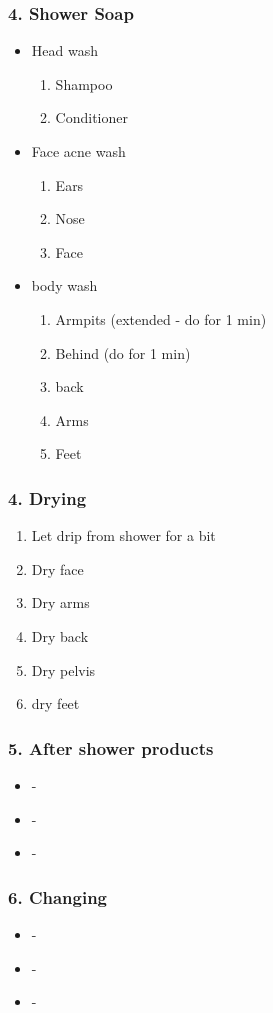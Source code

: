 \begin{frame}
\frametitle{4. Shower Soap  }
\begin{itemize}
\item Head wash
\begin{enumerate}
\item \tiny Shampoo
\item \tiny Conditioner
\end{enumerate}
\item Face acne wash
\begin{enumerate}
\item \tiny Ears
\item \tiny Nose
\item \tiny Face
\end{enumerate}
\item body wash
\begin{enumerate}
\item \tiny Armpits (extended - do for 1 min)
\item \tiny Behind (do for 1 min)
\item \tiny back
\item \tiny Arms
\item \tiny Feet
\end{enumerate}
\end{itemize}
\end{frame}

\begin{frame}
\frametitle{4. Drying}
\begin {enumerate}
\item \small Let drip from shower for a bit
\item \small Dry face
\item \small Dry arms
\item \small Dry back
\item \small Dry pelvis
\item \small dry feet
\end{enumerate}
\end{frame}

\begin{frame}
\frametitle{5. After shower products}
\begin{itemize}
\item \small -
\item \small -
\item \small -
\end{itemize}
\end{frame}

\begin{frame}
\frametitle{6. Changing}
\begin{itemize}
\item \small -
\item \small -
\item \small -
\end{itemize}
\end{frame}
